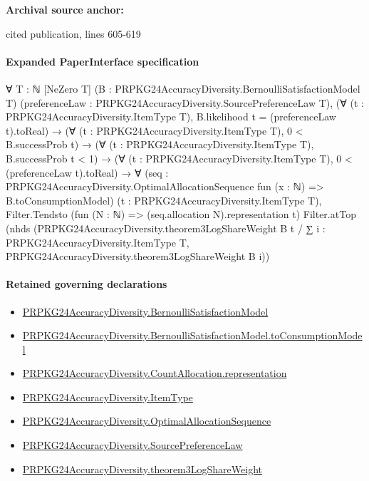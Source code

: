 \documentclass[10pt]{article}
\begin{document}
\textbf{Archival source anchor:} {\footnotesize\raggedright cited publication, lines 605-\allowbreak{}619\par}
\paragraph{Expanded PaperInterface specification}
\begin{ReviewVerbatim}
∀ {T : ℕ} [NeZero T] (B : PRPKG24AccuracyDiversity.BernoulliSatisfactionModel T)
  (preferenceLaw : PRPKG24AccuracyDiversity.SourcePreferenceLaw T),
  (∀ (t : PRPKG24AccuracyDiversity.ItemType T), B.likelihood t = (preferenceLaw t).toReal) →
    (∀ (t : PRPKG24AccuracyDiversity.ItemType T), 0 < B.successProb t) →
      (∀ (t : PRPKG24AccuracyDiversity.ItemType T), B.successProb t < 1) →
        (∀ (t : PRPKG24AccuracyDiversity.ItemType T), 0 < (preferenceLaw t).toReal) →
          ∀ (seq : PRPKG24AccuracyDiversity.OptimalAllocationSequence fun (x : ℕ) => B.toConsumptionModel)
            (t : PRPKG24AccuracyDiversity.ItemType T),
            Filter.Tendsto (fun (N : ℕ) => (seq.allocation N).representation t) Filter.atTop
              (nhds
                (PRPKG24AccuracyDiversity.theorem3LogShareWeight B t /
                  ∑ i : PRPKG24AccuracyDiversity.ItemType T, PRPKG24AccuracyDiversity.theorem3LogShareWeight B i))
\end{ReviewVerbatim}

\paragraph{Retained governing declarations}
\begin{itemize}\raggedright
\item \hyperlink{governing-declaration-ff558d2515b00bf9}{PRPKG24\allowbreak{}Accuracy\allowbreak{}Diversity.\allowbreak{}Bernoulli\allowbreak{}Satisfaction\allowbreak{}Model}
\item \hyperlink{governing-declaration-8d0c8285202429bc}{PRPKG24\allowbreak{}Accuracy\allowbreak{}Diversity.\allowbreak{}Bernoulli\allowbreak{}Satisfaction\allowbreak{}Model.\allowbreak{}to\allowbreak{}Consumption\allowbreak{}Model}
\item \hyperlink{paper-prerequisite-29fb13a9ce74aef5}{PRPKG24\allowbreak{}Accuracy\allowbreak{}Diversity.\allowbreak{}Count\allowbreak{}Allocation.\allowbreak{}representation}
\item \hyperlink{governing-declaration-562ef32e180a12be}{PRPKG24\allowbreak{}Accuracy\allowbreak{}Diversity.\allowbreak{}Item\allowbreak{}Type}
\item \hyperlink{governing-declaration-98821e74d0c4230b}{PRPKG24\allowbreak{}Accuracy\allowbreak{}Diversity.\allowbreak{}Optimal\allowbreak{}Allocation\allowbreak{}Sequence}
\item \hyperlink{governing-declaration-e662f313179ba80f}{PRPKG24\allowbreak{}Accuracy\allowbreak{}Diversity.\allowbreak{}Source\allowbreak{}Preference\allowbreak{}Law}
\item \hyperlink{governing-declaration-61acf619c6d4bf94}{PRPKG24\allowbreak{}Accuracy\allowbreak{}Diversity.\allowbreak{}theorem3\allowbreak{}Log\allowbreak{}Share\allowbreak{}Weight}
\end{itemize}
\end{document}
